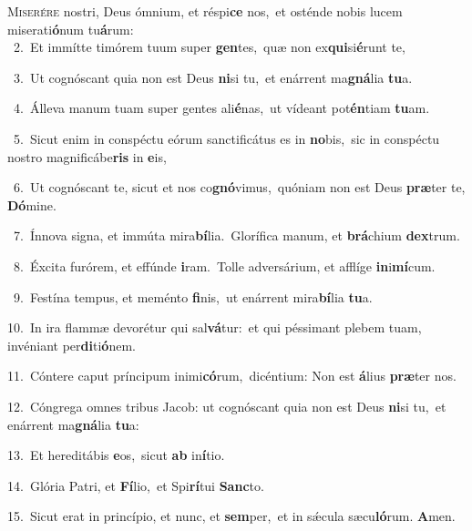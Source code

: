 \lettrine{\initial\textcolor{\initialcolor}{M}}{iserére} nostri, Deus ómnium, et réspi\textbf{ce} nos,~\star et osténde nobis lucem miserati\-\textbf{ó}\-num tu\-\textbf{á}\-rum:\\
{\numbfont\textcolor{\numbcolor}{~2.}}~Et immítte timórem tuum super \textbf{gen}\-tes,~\star quæ non ex\-\textbf{qui}\-si\-\textbf{é}\-runt te,\par
{\numbfont\textcolor{\numbcolor}{~3.}}~Ut cognóscant quia non est Deus \textbf{ni}\-si tu,~\star et enárrent ma\-\textbf{gná}\-lia \textbf{tu}\-a.\par
{\numbfont\textcolor{\numbcolor}{~4.}}~Álleva manum tuam super gentes ali\-\textbf{é}\-nas,~\star ut vídeant pot\-\textbf{én}\-tiam \textbf{tu}\-am.\par
{\numbfont\textcolor{\numbcolor}{~5.}}~Sicut enim in conspéctu eórum sanctificátus es in \textbf{no}\-bis,~\star sic in conspéctu nostro magnificábe\textbf{ris} in \textbf{e}\-is,\par
{\numbfont\textcolor{\numbcolor}{~6.}}~Ut cognóscant te, sicut et nos co\-\textbf{gnó}\-vimus,~\star quóniam non est Deus \textbf{præ}\-ter te, \textbf{Dó}\-mine.\par
{\numbfont\textcolor{\numbcolor}{~7.}}~Ínnova signa, et immúta mira\-\textbf{bí}\-lia.~\star Glorífica manum, et \textbf{brá}\-chium \textbf{dex}\-trum.\par
{\numbfont\textcolor{\numbcolor}{~8.}}~Éxcita furórem, et effúnde \textbf{i}\-ram.~\star Tolle adversárium, et afflíge \textbf{in}\-i\-\textbf{mí}\-cum.\par
{\numbfont\textcolor{\numbcolor}{~9.}}~Festína tempus, et meménto \textbf{fi}\-nis,~\star ut enárrent mira\-\textbf{bí}\-lia \textbf{tu}\-a.\par
{\numbfont\textcolor{\numbcolor}{10.}}~In ira flammæ devorétur qui sal\-\textbf{vá}\-tur:~\star et qui péssimant plebem tuam, invéniant per\-\textbf{di}\-ti\-\textbf{ó}\-nem.\par
{\numbfont\textcolor{\numbcolor}{11.}}~Cóntere caput príncipum inimi\-\textbf{có}\-rum,~\star dicéntium: Non est \textbf{á}\-lius \textbf{præ}\-ter nos.\par
{\numbfont\textcolor{\numbcolor}{12.}}~Cóngrega omnes tribus Jacob: ut cognóscant quia non est Deus \textbf{ni}\-si tu,~\star et enárrent ma\-\textbf{gná}\-lia \textbf{tu}\-a:\par
{\numbfont\textcolor{\numbcolor}{13.}}~Et hereditábis \textbf{e}\-os,~\star sicut \textbf{ab} in\-\textbf{í}\-tio.\par
{\numbfont\textcolor{\numbcolor}{14.}}~Glória Patri, et \textbf{Fí}\-lio,~\star et Spi\-\textbf{rí}\-tui \textbf{Sanc}\-to.\par
{\numbfont\textcolor{\numbcolor}{15.}}~Sicut erat in princípio, et nunc, et \textbf{sem}\-per,~\star et in sǽcula sæcu\-\textbf{ló}\-rum. \textbf{A}\-men.\par
